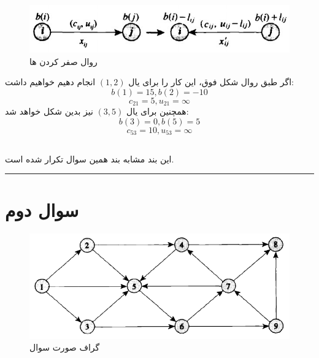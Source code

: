 \documentclass{article}
\begin{document}
\begin{multicols}{2}
\subsection*{}
\begin{figure}[H]
    \center
    \includegraphics[width=0.9\linewidth]{Photos/HW2/nonzero_lb.png}
    \caption{
    روال صفر کردن
    ها
    }
    \label{fig:my_label}
\end{figure}
اگر طبق روال شکل فوق، این کار را برای یال
$(1, 2)$
انجام دهیم خواهیم داشت:
$$b(1) = 15, b(2) = -10$$
$$c_{21} = 5, u_{21} = \infty$$
همچنین برای یال
$(3, 5)$
نیز بدین شکل خواهد شد:
$$b(3) = 0, b(5) = 5$$
$$c_{53} = 10, u_{53} = \infty$$

\subsection*{}
این بند مشابه بند
همین سوال تکرار شده است.\\
\rule{\linewidth}{1pt}
\section*{سوال دوم}
\begin{figure}[H]
    \center
    \includegraphics[width=0.9\linewidth]{Photos/HW2/2.png}
    \caption{
    گراف صورت سوال
    }
    \label{fig:my_label}
\end{figure}


\end{multicols}
\end{document}

